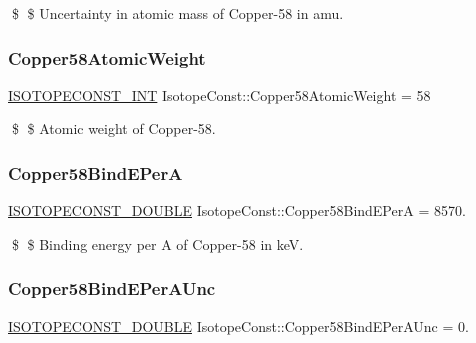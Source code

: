\$ \$ Uncertainty in atomic mass of Copper-\/58 in amu. \mbox{\label{group___isotope_const-_copper-_cu58_gaa9ccdae97afc2a4463fcc1b8072fdfa3}} 
\subsubsection{\texorpdfstring{Copper58\+Atomic\+Weight}{Copper58AtomicWeight}}
{\footnotesize\ttfamily \mbox{\hyperlink{group___isotope_const-_macros_ga5f18360b3e99483a35c32d789e62621c}{I\+S\+O\+T\+O\+P\+E\+C\+O\+N\+S\+T\+\_\+\+I\+NT}} Isotope\+Const\+::\+Copper58\+Atomic\+Weight = 58}

\$ \$ Atomic weight of Copper-\/58. \mbox{\label{group___isotope_const-_copper-_cu58_gabf8c61877902e7cec4a45c3e12042e3e}} 
\subsubsection{\texorpdfstring{Copper58\+Bind\+E\+PerA}{Copper58BindEPerA}}
{\footnotesize\ttfamily \mbox{\hyperlink{group___isotope_const-_macros_ga8f45a7272ce02c0b4c65c44636ed719a}{I\+S\+O\+T\+O\+P\+E\+C\+O\+N\+S\+T\+\_\+\+D\+O\+U\+B\+LE}} Isotope\+Const\+::\+Copper58\+Bind\+E\+PerA = 8570.}

\$ \$ Binding energy per A of Copper-\/58 in keV. \mbox{\label{group___isotope_const-_copper-_cu58_gaf9132c56b5182e106a0c087ee0184928}} 
\subsubsection{\texorpdfstring{Copper58\+Bind\+E\+Per\+A\+Unc}{Copper58BindEPerAUnc}}
{\footnotesize\ttfamily \mbox{\hyperlink{group___isotope_const-_macros_ga8f45a7272ce02c0b4c65c44636ed719a}{I\+S\+O\+T\+O\+P\+E\+C\+O\+N\+S\+T\+\_\+\+D\+O\+U\+B\+LE}} Isotope\+Const\+::\+Copper58\+Bind\+E\+Per\+A\+Unc = 0.}

